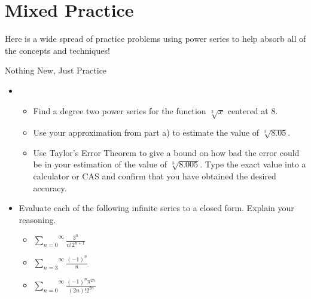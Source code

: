 \section{Mixed Practice}
Here is a wide spread of practice problems using power series to help absorb all of the concepts and techniques!

\begin{exercise}{Nothing New, Just Practice \Coffeecup \Coffeecup}
\begin{itemize}

\item \begin{itemize} \item Find a degree two power series for the function $ \sqrt[3]{x} $ centered at 8. 
 
\vspace*{2in}

\item Use your approximation from part a) to estimate the value of $\sqrt[3]{8.05}$.

\vspace*{2in}

\item Use Taylor's Error Theorem to give a bound on how bad the error could be in your estimation of the value of $\sqrt[3]{8.005}$.  Type the exact value into a calculator or CAS and confirm that you have obtained the desired accuracy.

\vspace*{2in}

\end{itemize}

\item Evaluate each of the following infinite series to a closed form.  Explain your reasoning. \begin{itemize}
\item  $ \overset{\infty}{\underset{n=0}{\sum}} \frac{3^n}{n!2^{n+1}}$

\vspace*{1.5in}

\item $ \overset{\infty}{\underset{n=3}{\sum}} \frac{(-1)^n}{n} $

\vspace*{1.5in}

\item $ \overset{\infty}{\underset{n=0}{\sum}} \frac{(-1)^{n}\pi^{2n}}{(2n)!2^{2n}} $

\vspace*{1.5in}


\end{itemize}
\end{itemize}
\end{exercise}
